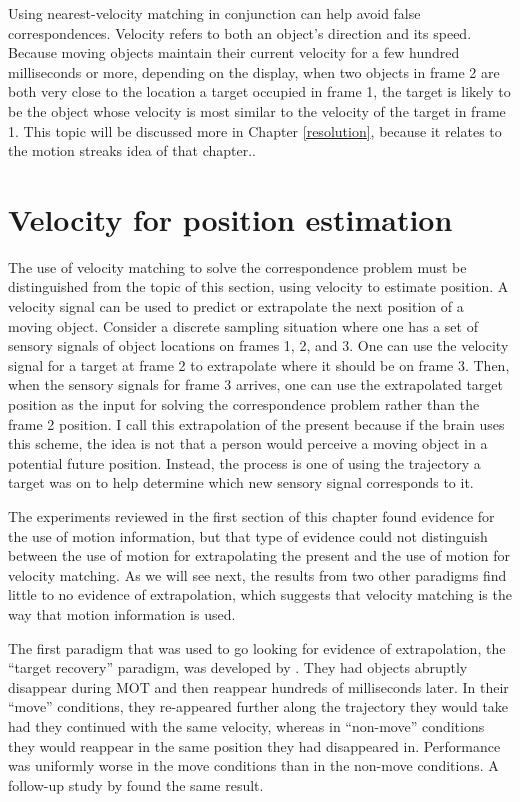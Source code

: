 \documentclass[
]{book}
\begin{document}
Using nearest-velocity matching in conjunction can help avoid false correspondences. Velocity refers to both an object's direction and its speed. Because moving objects maintain their current velocity for a few hundred milliseconds or more, depending on the display, when two objects in frame 2 are both very close to the location a target occupied in frame 1, the target is likely to be the object whose velocity is most similar to the velocity of the target in frame 1. This topic will be discussed more in Chapter \ref{resolution}, because it relates to the motion streaks idea of that chapter..

\hypertarget{velocity-for-position-estimation}{%
\section{Velocity for position estimation}\label{velocity-for-position-estimation}}

The use of velocity matching to solve the correspondence problem must be distinguished from the topic of this section, using velocity to estimate position. A velocity signal can be used to predict or extrapolate the next position of a moving object. Consider a discrete sampling situation where one has a set of sensory signals of object locations on frames 1, 2, and 3. One can use the velocity signal for a target at frame 2 to extrapolate where it should be on frame 3. Then, when the sensory signals for frame 3 arrives, one can use the extrapolated target position as the input for solving the correspondence problem rather than the frame 2 position. I call this extrapolation of the present because if the brain uses this scheme, the idea is not that a person would perceive a moving object in a potential future position. Instead, the process is one of using the trajectory a target was on to help determine which new sensory signal corresponds to it.

The experiments reviewed in the first section of this chapter found evidence for the use of motion information, but that type of evidence could not distinguish between the use of motion for extrapolating the present and the use of motion for velocity matching. As we will see next, the results from two other paradigms find little to no evidence of extrapolation, which suggests that velocity matching is the way that motion information is used.

The first paradigm that was used to go looking for evidence of extrapolation, the ``target recovery'' paradigm, was developed by \citet{keaneMotionExtrapolationEmployed2006}. They had objects abruptly disappear during MOT and then reappear hundreds of milliseconds later. In their ``move'' conditions, they re-appeared further along the trajectory they would take had they continued with the same velocity, whereas in ``non-move'' conditions they would reappear in the same position they had disappeared in. Performance was uniformly worse in the move conditions than in the non-move conditions. A follow-up study by \citet{franconeriSimpleProximityHeuristic2012} found the same result.
\end{document}
